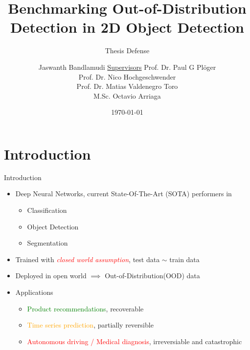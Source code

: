 \documentclass[10pt, aspectratio=169]{beamer}
\author[Jaswanth]{Jaswanth Bandlamudi \newline \newline \underline{Supervisors} \newline \vfill Prof. Dr. Paul G Pl\"{o}ger\\Prof. Dr. Nico Hochgeschwender \\ Prof. Dr. Matias Valdenegro Toro \\ M.Sc. Octavio Arriaga}
\title{Benchmarking Out-of-Distribution Detection in 2D Object Detection}
\subtitle{Thesis Defense}
\institute[HBRS]{Hochschule Bonn-Rhein-Sieg}
\date{\today}
\begin{document}
\setlength{\parskip}{1em}
\renewcommand{\baselinestretch}{1.25}
{
\begin{frame}
\titlepage
\end{frame}
}

\section{Introduction}
\begin{frame}{Introduction}
\begin{itemize}
    \item Deep Neural Networks, current State-Of-The-Art (SOTA) performers in 
    \begin{itemize}
        \item Classification
        \item Object Detection
        \item Segmentation
    \end{itemize} 

    \item Trained with \textcolor{red}{\textit{closed world assumption}}, test data $\sim$ train data
    \item Deployed in open world $\implies$ Out-of-Distribution(OOD) data
    \item Applications
        \begin{itemize}
            \item \textcolor{green}{Product recommendations}, recoverable
            \item \textcolor{orange}{Time series prediction}, partially reversible
            \item \textcolor{red}{Autonomous driving / Medical diagnosis}, irreversiable and catastrophic
        \end{itemize}
\end{itemize}
\end{frame}
\end{document}
